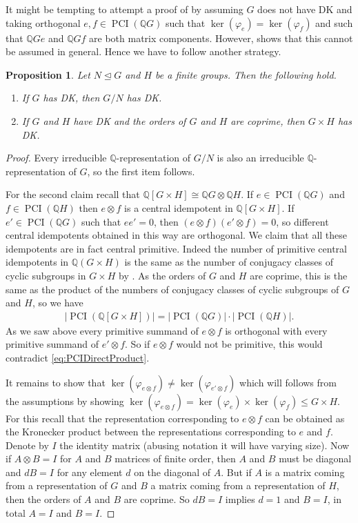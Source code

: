 \documentclass[a4paper,10pt]{amsart}
\newtheorem{proposition}[lemma]{Proposition}
\theoremstyle{definition}
\theoremstyle{remark}
\newcommand\PCI{\operatorname{PCI}}
\newcommand{\Q}{{\mathbb Q}}
\begin{document}
It might be tempting to attempt a proof of  by assuming $G$ does not have DK and taking orthogonal $e,f \in \PCI(\Q G)$ such that $\ker(\varphi_e) = \ker(\varphi_f)$ and such that $\Q Ge$ and $\Q G f$ are both matrix components. However,  shows that this cannot be assumed in general. Hence we have to follow another strategy.


\begin{proposition}\label{prop:DKDirectProductsAndQuotients}
Let $N \unlhd G$ and $H$ be a finite groups. Then the following hold.
\begin{enumerate}
\item If $G$ has DK, then $G/N$ has DK.
\item If $G$ and $H$ have DK and the orders of $G$ and $H$ are coprime, then $G \times H$ has DK.
\end{enumerate}
\end{proposition}
\begin{proof}
Every irreducible $\Q$-representation of $G/N$ is also an irreducible $\Q$-representation of $G$, so the first item follows.

For the second claim recall that $\Q[G \times H] \cong \Q G \otimes \Q H$. If $e \in \PCI(\Q G)$ and $f \in \PCI(\Q H)$ then $e \otimes f$ is a central idempotent in $\Q[G \times H]$. If $e' \in \PCI(\Q G)$ such that $ee'= 0$, then $(e \otimes f)(e' \otimes f) = 0$, so different central idempotents obtained in this way are orthogonal. We claim that all these idempotents are in fact central primitive. Indeed the number of primitive central idempotents in $\Q(G\times H)$ is the same as the number of conjugacy classes of cyclic subgroups in $G \times H$ by \cite[Corollary 7.1.12]{GRG1}. As the orders of $G$ and $H$ are coprime, this is the same as the product of the numbers of conjugacy classes of cyclic subgroups of $G$ and $H$, so we have 
\begin{align}\label{eq:PCIDirectProduct}
|\PCI(\Q[G \times H])| = |\PCI(\Q G)|\cdot |\PCI(\Q H)|.
\end{align}
As we saw above every primitive summand of $e \otimes f$ is orthogonal with every primitive summand of $e' \otimes f$. So if $e \otimes f$ would not be primitive, this would contradict \eqref{eq:PCIDirectProduct}.

It remains to show that $\ker(\varphi_{e \otimes f}) \neq \ker(\varphi_{e' \otimes f})$ which will follows from the assumptions by showing $\ker(\varphi_{e\otimes f}) = \ker(\varphi_e) \times \ker(\varphi_f) \leq G \times H$. For this recall that the representation corresponding to $e \otimes f$ can be obtained as the Kronecker product between the representations corresponding to $e$ and $f$. Denote by $I$ the identity matrix (abusing notation it will have varying size). Now if $A \otimes B = I$ for $A$ and $B$ matrices of finite order, then $A$ and $B$ must be diagonal and $dB=I$ for any element $d$ on the diagonal of $A$. But if $A$ is a matrix coming from a representation of $G$ and $B$ a matrix coming from a representation of $H$, then the orders of $A$ and $B$ are coprime. So $dB = I$ implies $d =1$ and $B = I$, in total $A=I$ and $B=I$. 
\end{proof}
\end{document}

